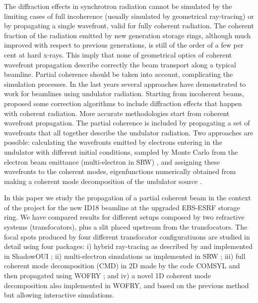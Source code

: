 \documentclass{iucr}              %
\begin{document}
The diffraction effects in synchrotron radiation cannot be simulated by the limiting cases of full incoherence (usually simulated by geometrical ray-tracing) or by propagating a single wavefront, valid for fully coherent radiation. The coherent fraction of the radiation emitted by new generation storage rings, although much improved with respect to previous generations, is still of the order of a few per cent at hard x-rays. This imply that none of geometrical optics of coherent wavefront propagation describe correctly the beam transport along a typical beamline. Partial coherence should be taken into account, complicating the simulation processes. In the last years several approaches have demonstrated to work for beamlines using undulator radiation. Starting from incoherent beams,  proposed some correction algorithms to include diffraction effects that happen with coherent radiation. More accurate methodologies start from coherent wavefront propagation. The partial coherence is included by propagating a set of wavefronts that all together describe the undulator radiation. Two approaches are possible: calculating the wavefronts emitted by electrons entering in the undulator with different initial conditions, sampled by Monte Carlo from the electron beam emittance (multi-electron in SRW) \cite{codeSRW_ME}, and assigning these wavefronts to the coherent modes, eigenfunctions numerically obtained from making a coherent mode decomposition of the undulator source \cite{codeCOMSYL}.  

In this paper we study the propagation of a partial coherent beam in the context of the project for the new ID18 beamline at the upgraded EBS-ESRF storage ring. We have compared results for different setups composed by two refractive systems (transfocators), plus a slit placed upstream from the transfocators. The focal spots produced by four different transfocator configuratiuons are studied in detail using four packages: i) hybrid ray-tracing as described by  and implemented in ShadowOUI \cite{codeSHADOWOUI}; ii) multi-electron simulations as implemented in SRW \cite{codeSRW}; iii) full coherent mode decomposition (CMD) in 2D made by the code COMSYL \cite{codeCOMSYL} and then propagated using WOFRY \cite{codeWOFRY}; and iv) a novel 1D coherent mode decomposition also implemented in WOFRY, and based on the previous method but allowing interactive simulations. 

\end{document}

